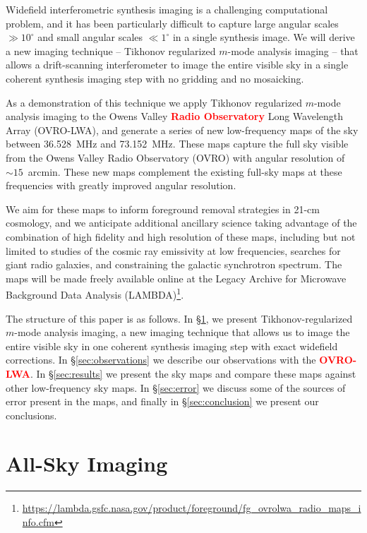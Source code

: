 \documentclass[twocolumn]{aastex61}
\newcommand{\revision}[1]{\textcolor{red}{\textbf{#1}}}
\begin{document}
Widefield interferometric synthesis imaging is a challenging computational problem, and it has been
particularly difficult to capture large angular scales $\gg 10^\circ$ and small angular scales $\ll
1^\circ$ in a single synthesis image. We will derive a new imaging technique -- Tikhonov regularized
$m$-mode analysis imaging -- that allows a drift-scanning interferometer to image the entire visible
sky in a single coherent synthesis imaging step with no gridding and no mosaicking.

As a demonstration of this technique we apply Tikhonov regularized $m$-mode analysis imaging to the
Owens Valley \revision{Radio Observatory} Long Wavelength Array (OVRO-LWA), and generate a series of new
low-frequency maps of the sky between 36.528~MHz and 73.152~MHz.  These maps capture the full sky
visible from the Owens Valley Radio Observatory (OVRO) with angular resolution of $\sim 15$~arcmin.
These new maps complement the existing full-sky maps at these frequencies with greatly improved
angular resolution.

We aim for these maps to inform foreground removal strategies in 21-cm cosmology, and we anticipate
additional ancillary science taking advantage of the combination of high fidelity and high
resolution of these maps, including but not limited to studies of the cosmic ray emissivity at low
frequencies, searches for giant radio galaxies, and constraining the galactic synchrotron spectrum.
The maps will be made freely available online at the Legacy Archive for Microwave Background Data
Analysis (LAMBDA)\footnote{
    \url{https://lambda.gsfc.nasa.gov/product/foreground/fg_ovrolwa_radio_maps_info.cfm}
}.

The structure of this paper is as follows. In \S\ref{sec:imaging}, we present Tikhonov-regularized
$m$-mode analysis imaging, a new imaging technique that allows us to image the entire visible sky in
one coherent synthesis imaging step with exact widefield corrections. In \S\ref{sec:observations} we
describe our observations with the \revision{OVRO-LWA}. In \S\ref{sec:results} we present the sky
maps and compare these maps against other low-frequency sky maps.  In \S\ref{sec:error} we discuss
some of the sources of error present in the maps, and finally in \S\ref{sec:conclusion} we present
our conclusions.

\section{All-Sky Imaging}\label{sec:imaging}
\end{document}
